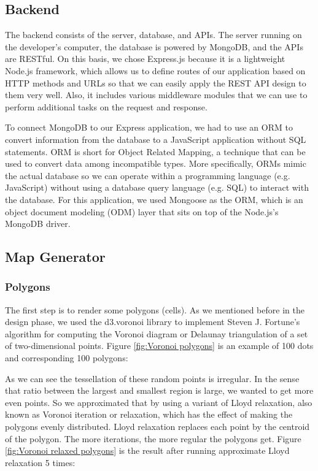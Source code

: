 \begin{enumerate}
\end{enumerate}

\subsection{Backend}
The backend consists of the server, database, and APIs. The server running on the developer's computer, the database is powered by MongoDB, and the APIs are RESTful. On this basis, we chose Express.js because it is a lightweight Node.js framework, which allows us to define routes of our application based on HTTP methods and URLs so that we can easily apply the REST API design to them very well. Also, it includes various middleware modules that we can use to perform additional tasks on the request and response.

To connect MongoDB to our Express application, we had to use an ORM to convert information from the database to a JavaScript application without SQL statements. ORM is short for Object Related Mapping, a technique that can be used to convert data among incompatible types. More specifically, ORMs mimic the actual database so we can operate within a programming language (e.g. JavaScript) without using a database query language (e.g. SQL) to interact with the database. For this application, we used Mongoose as the ORM, which is an object document modeling (ODM) layer that sits on top of the Node.js's MongoDB driver.

\subsection{Map Generator}

\subsubsection{Polygons}
The first step is to render some polygons (cells). As we mentioned before in the design phase, we used the d3.voronoi library to implement Steven J. Fortune’s algorithm for computing the Voronoi diagram or Delaunay triangulation of a set of two-dimensional points. Figure \ref{fig:Voronoi polygons} is an example of 100 dots and corresponding 100 polygons:

As we can see the tessellation of these random points is irregular. In the sense that ratio between the largest and smallest region is large, we wanted to get more even points. So we approximated that by using a variant of Lloyd relaxation, also known as Voronoi iteration or relaxation, which has the effect of making the polygons evenly distributed. Lloyd relaxation replaces each point by the centroid of the polygon. The more iterations, the more regular the polygons get. Figure \ref{fig:Voronoi relaxed polygons} is the result after running approximate Lloyd relaxation 5 times:


